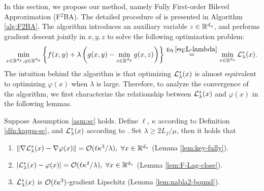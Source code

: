 \documentclass[twoside,11pt]{article}
\begin{document}
In this section, we propose our method, namely Fully First-order Bilevel Approximation (F${}^2$BA). The detailed procedure of is presented in Algorithm \ref{alg:F2BA}. The algorithm introduces an auxiliary variable $z \in {\mathbb{R}}^{d_y}$, and performs gradient descent jointly in $x,y,z$ to solve the following optimization problem:
\begin{align}  \label{eq:opt-xyz}
     \min_{x \in {\mathbb{R}}^{d_x}, y \in {\mathbb{R}}^{d_y}} \left\{f(x,y) + \lambda \left(g(x,y) - \min_{z \in {\mathbb{R}}^{d_y}} g(x,z)\right)\right\} \overset{\rm Eq. \ref{eq:L-lambda}}{=} \min_{x \in {\mathbb{R}}^{d_x}} {\mathcal{L}}_{\lambda}^*(x).
\end{align}
The intuition behind the algorithm is that optimizing ${\mathcal{L}}_{\lambda}^*(x)$ is almost equivalent to optimizing $\varphi(x)$ when $\lambda$ is large.
Therefore, to analyze the convergence of the algorithm, we first characterize the relationship between 
${\mathcal{L}}_{\lambda}^*(x)$ and $\varphi(x)$ in the following lemmas.
 
 

\begin{lem} \label{lem:1st}
Suppose Assumption \ref{asm:sc} holds. Define $\ell$,  $\kappa$ according to Definition \ref{dfn:kappa-sc}, and ${\mathcal{L}}_{\lambda}^*(x)$ according to . Set $\lambda \ge 2L_f /\mu $, then it holds that 
\begin{enumerate}[label=\alph*.]
    \item $\Vert \nabla {\mathcal{L}}_{\lambda}^*(x) - \nabla \varphi(x) \Vert = {\mathcal{O}}(\ell \kappa^3 /\lambda),~\forall x \in {\mathbb{R}}^{d_x}$ {\rm (Lemma \ref{lem:key-fully})}.
    \item $\vert {\mathcal{L}}_{\lambda}^*(x) - \varphi(x) \vert ={\mathcal{O}}(\ell \kappa^2/ \lambda),~\forall x \in {\mathbb{R}}^{d_x}$ {\rm (Lemma \ref{lem:F-Lag-close})}.
    \item ${\mathcal{L}}_{\lambda}^*(x) $ is ${\mathcal{O}}(\ell \kappa^3)$-gradient Lipschitz {\rm (Lemma \ref{lem:nabla2-bound})}.
\end{enumerate}
\end{lem}
\end{document}
